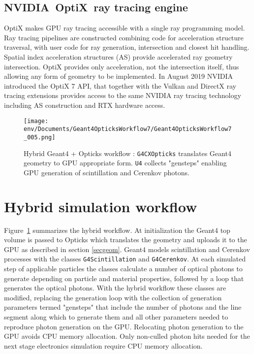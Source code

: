 \documentclass{webofc}
\begin{document}
\subsection{NVIDIA\textregistered\ OptiX\texttrademark\ ray tracing engine}
%
OptiX makes GPU ray tracing accessible with a single ray programming model.
Ray tracing pipelines are constructed combining code for acceleration structure traversal, 
with user code for ray generation, intersection and closest hit handling.
Spatial index acceleration structures (AS) provide accelerated ray geometry intersection. 
OptiX provides only acceleration, not the intersection itself, thus allowing any form of geometry 
to be implemented. 
%
In August 2019 NVIDIA introduced the OptiX 7 API\cite{optix7},
that together with the Vulkan and DirectX ray tracing extensions provides access 
to the same NVIDIA ray tracing technology including AS construction and RTX hardware access. 
%
%
%
%
\begin{figure}[t]
\centering
\texttt{[image: env/Documents/Geant4OpticksWorkflow7/Geant4OpticksWorkflow7\_005.png]}
\caption{Hybrid Geant4 + Opticks workflow : {\tt G4CXOpticks} translates Geant4 geometry to GPU appropriate form. 
{\tt U4} collects "gensteps" enabling GPU generation of scintillation and Cerenkov photons.
}
\label{workflow} 
\end{figure}
%
\section{Hybrid simulation workflow}%
\label{secworkflow}%
%
Figure~\ref{workflow} summarizes the hybrid workflow. 
At initialization the Geant4 top volume is passed to Opticks
which translates the geometry and uploads it to the GPU as described in section \ref{secgeom}.
%
Geant4 models scintillation and Cerenkov processes with the classes {\tt G4Scintillation} and {\tt G4Cerenkov}. 
At each simulated step of applicable particles the classes calculate a number of optical photons 
to generate depending on particle and material properties, followed by a loop that generates the optical photons. 
With the hybrid workflow these classes are modified, replacing the generation loop with the collection of 
generation parameters termed "gensteps" that include the number of photons and the line segment along which to generate them and all
other parameters needed to reproduce photon generation on the GPU. Relocating photon generation to the
GPU avoids CPU memory allocation. Only non-culled photon hits needed for the next stage electronics 
simulation require CPU memory allocation. 
\end{document}
